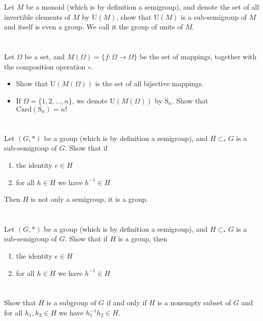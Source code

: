 \documentclass{report}
\begin{document}
\section{}
Let $M$ be a monoid (which is by definition a semigroup), and denote the set of all invertible elements of $M$ by $\text{U}(M)$, show that $\text{U}(M)$ is a sub-semigroup of $M$ and itself is even a group. We call it the group of units of $M$.
\section{}
Let $\Omega$ be a set, and $M(\Omega) = \{f: \Omega \rightarrow \Omega\}$ be the set of mappings, together with the composition operation $\circ$.
\begin{itemize}
\item Show that $\text{U}(M(\Omega))$ is the set of all bijective mappings.
\item If $\Omega = \{1,2,\dots,n\}$, we denote $\text{U}(M(\Omega))$ by $\text{S}_n$. Show that $\text{Card}(\text{S}_n) = n!$
\end{itemize}
\section{}
Let $(G,*)$ be a group (which is by definition a semigroup), and $H \subset_* G$ is a sub-semigroup of $G$. Show that if
\begin{enumerate}
\item the identity $e \in H$
\item for all $h \in H$ we have $h^{-1} \in H$
\end{enumerate}
Then $H$ is not only a semigroup, it is a group.
\section{}
Let $(G,*)$ be a group (which is by definition a semigroup), and $H \subset_* G$ is a sub-semigroup of $G$. Show that if $H$ is a group, then
\begin{enumerate}
\item the identity $e \in H$
\item for all $h \in H$ we have $h^{-1} \in H$
\end{enumerate}
\section{}
Show that $H$ is a subgroup of $G$ if and only if $H$ is a nonempty subset of $G$ and for all $h_1,h_2 \in H$ we have $h_1^{-1}h_2 \in H$.
\end{document}
